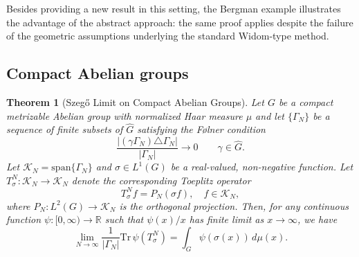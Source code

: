 \documentclass{amsart}
\newtheorem{thm}{Theorem}[section]
\theoremstyle{definition}
\theoremstyle{remark}
\numberwithin{equation}{section}
\begin{document}

Besides providing a new result in this setting, the Bergman example illustrates the advantage of the abstract approach: the same proof applies despite the failure of the geometric assumptions underlying the standard Widom-type method.


\subsection{Compact Abelian groups}

\begin{thm}[Szeg\H{o} Limit on Compact Abelian Groups]
\label{thm:compact_ab_group}
Let $G$ be a compact metrizable Abelian group with normalized Haar measure $\mu$ and let $\{\Gamma_N\}$ be a sequence of finite subsets of $\widehat G$ satisfying the F\o lner condition
\[
\frac{|(\gamma\Gamma_N)\triangle\Gamma_N|}{|\Gamma_N|}
\longrightarrow0
\qquad \gamma\in\widehat G.
\]
Let $\mathcal{K}_{N}=\text{span}\{\Gamma_{N}\}$ and $\sigma \in L^1(G)$ be a real-valued, non-negative function. Let $T_\sigma^N : \mathcal{K}_N \to \mathcal{K}_N$ denote the corresponding Toeplitz operator
\[
T_\sigma^N f = P_N (\sigma f), \quad f \in \mathcal{K}_N,\]
where $P_N : L^2(G) \to \mathcal{K}_N$ is the orthogonal projection. Then, for any continuous function $\psi : [0,\infty) \to \mathbb{R}$ such that $\psi(x)/x$ has finite limit as $x \to \infty$, we have
\[
\lim_{N\to\infty} \frac{1}{|\Gamma_N|} \mathrm{Tr} \, \psi(T_\sigma^N) = \int_G \psi(\sigma(x)) \, d\mu(x).
\]
\end{thm}

\end{document}
